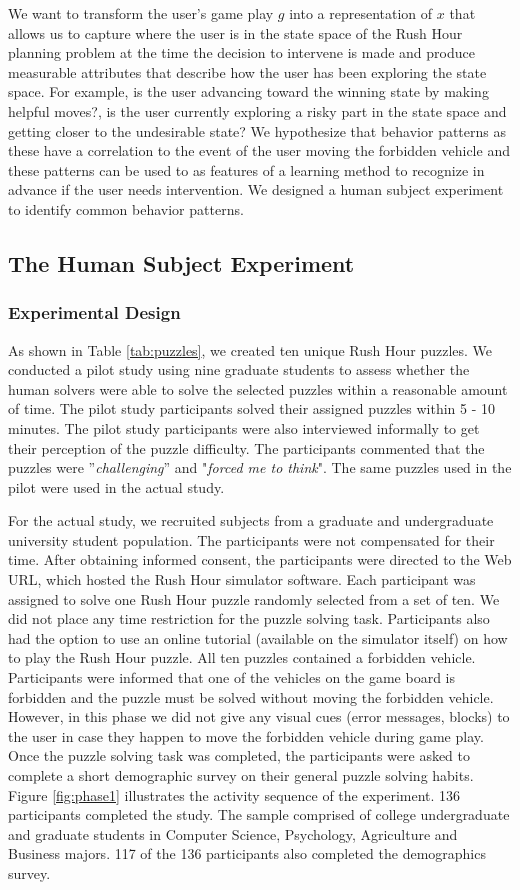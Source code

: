\documentclass[doctor]{thesis} %
\theoremstyle{plain}
\begin{document}
We want to transform the user's game play $g$ into a representation of $x$ that allows us to capture where the user is in the state space of the Rush Hour planning problem at the time the decision to intervene is made and  produce measurable attributes that describe how the user has been exploring the state space. For example, is the user advancing toward the winning state by making helpful moves?, is the user currently exploring a risky part in the state space and getting closer to the undesirable state? We hypothesize that behavior patterns as these have a correlation to the event of the user moving the forbidden vehicle and these patterns can be used to as features of a learning method to recognize in advance if the user needs intervention. We designed a human subject experiment to identify common behavior patterns.

\subsection*{The Human Subject Experiment}
\subsubsection*{Experimental Design}
As shown in Table \ref{tab:puzzles}, we created ten unique Rush Hour puzzles. We conducted a pilot study using nine graduate students to assess whether the human solvers were able to solve the selected puzzles within a reasonable amount of time. The pilot study participants solved their assigned puzzles within 5 - 10 minutes. The pilot study participants were also interviewed informally to get their perception of the puzzle difficulty. The participants commented that the puzzles were ''\textit{challenging}'' and "\textit{forced me to think}". The same puzzles used in the pilot were used in the actual study.

For the actual study, we recruited subjects from a graduate and undergraduate university student population. The participants were not compensated for their time. After obtaining informed consent, the participants were directed to the Web URL, which hosted the Rush Hour simulator software. Each participant was assigned to solve one Rush Hour puzzle randomly selected from a set of ten. We did not place any time restriction for the puzzle solving task. Participants also had the option to use an online tutorial (available on the simulator itself) on how to play the Rush Hour puzzle. All ten puzzles contained a forbidden vehicle. Participants were informed that one of the vehicles on the game board is forbidden and the puzzle must be solved without moving the forbidden vehicle. However, in this phase we did not give any visual cues (error messages, blocks) to the user in case they happen to move the forbidden vehicle during game play. Once the puzzle solving task was completed, the participants were asked to complete a short demographic survey on their general puzzle solving habits. Figure \ref{fig:phase1} illustrates the activity sequence of the experiment. 136 participants completed the study. The sample comprised of college undergraduate and graduate students in Computer Science, Psychology, Agriculture and Business majors. 117 of the 136 participants also completed the demographics survey.
\end{document}
